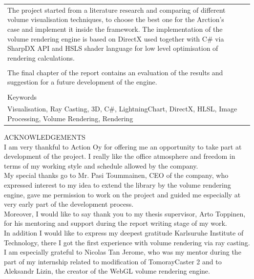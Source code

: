 \documentclass[english]{article}
\begin{document}
\begin{table}[htbp]
\begin{tabular}{| l | l | l | l |}
{The project started from a literature research and comparing of different volume visualisation techniques, to choose the best one for the Arction's case and implement it inside the framework. The implementation of the volume rendering engine is based on DirectX used together with C\# via SharpDX API and HSLS shader language for low level optimisation of rendering calculations.
}\\
\multicolumn{4}{|l|}{ }\\
\multicolumn{4}{|p{14cm}|}{
The final chapter of the report contains an evaluation of the results and suggestion for a future development of the engine.
}\\
\multicolumn{4}{|l|}{ }\\
\hline
\multicolumn{4}{|l|}{Keywords}\\
\multicolumn{4}{|p{14cm}|}{Visualisation, Ray Casting, 3D, C\#, LightningChart, DirectX, HLSL, Image Processing, Volume Rendering, Rendering}\\
\hline
\end{tabular}
\end{table}

\newpage

ACKNOWLEDGEMENTS\\

I am very thankful to Action Oy for offering me an opportunity to take part at development of the project. I really like the office atmosphere and freedom in terms of my working style and schedule allowed by the company.\\

My special thanks go to Mr. Pasi Toummainen, CEO of the company, who expressed interest to my idea to extend the library by the volume rendering engine,  gave me permission to work on the project and guided me especially at very early part of the development process.\\

Moreover, I would like to say thank you to my thesis supervisor, Arto Toppinen, for his mentoring and support during the report writing stage of my work. \\

In addition I would like to express my deepest gratitude Karlsuruhe Institute of Technology, there I got the first experience with volume rendering via ray casting. I am especially grateful to Nicolas Tan Jerome, who was my mentor during the part of my internship related to modification of TomorayCaster 2 and to Aleksandr Lizin, the creator of the WebGL volume rendering engine.

\newpage

\tableofcontents
\end{document}
